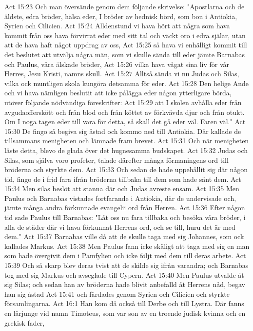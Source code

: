 Act 15:23  Och man översände genom dem följande skrivelse: "Apostlarna och de äldste, edra bröder, hälsa eder, I bröder av hednisk börd, som bon i Antiokia, Syrien och Cilicien.
Act 15:24  Alldenstund vi hava hört att några som hava kommit från oss hava förvirrat eder med sitt tal och väckt oro i edra själar, utan att de hava haft något uppdrag av oss,
Act 15:25  så hava vi enhälligt kommit till det beslutet att utvälja några män, som vi skulle sända till eder jämte Barnabas och Paulus, våra älskade bröder,
Act 15:26  vilka hava vågat sina liv för vår Herres, Jesu Kristi, namns skull.
Act 15:27  Alltså sända vi nu Judas och Silas, vilka ock muntligen skola kungöra detsamma för eder.
Act 15:28  Den helige Ande och vi hava nämligen beslutit att icke pålägga eder någon ytterligare börda, utöver följande nödvändiga föreskrifter:
Act 15:29  att I skolen avhålla eder från avgudaofferskött och från blod och från köttet av förkvävda djur och från otukt. Om I noga tagen eder till vara för detta, så skall det gå eder väl. Faren väl."
Act 15:30  De fingo så begiva sig åstad och kommo ned till Antiokia. Där kallade de tillsammans menigheten och lämnade fram brevet.
Act 15:31  Och när menigheten läste detta, blevo de glada över det hugnesamma budskapet.
Act 15:32  Judas och Silas, som själva voro profeter, talade därefter många förmaningens ord till bröderna och styrkte dem.
Act 15:33  Och sedan de hade uppehållit sig där någon tid, fingo de i frid fara ifrån bröderna tillbaka till dem som hade sänt dem.
Act 15:34  Men silas beslöt att stanna där och Judas avreste ensam.
Act 15:35  Men Paulus och Barnabas vistades fortfarande i Antiokia, där de undervisade och, jämte många andra förkunnade evangelii ord från Herren.
Act 15:36  Efter någon tid sade Paulus till Barnabas: "Låt oss nu fara tillbaka och besöka våra bröder, i alla de städer där vi hava förkunnat Herrens ord, och se till, huru det är med dem."
Act 15:37  Barnabas ville då att de skulle taga med sig Johannes, som ock kallades Markus.
Act 15:38  Men Paulus fann icke skäligt att taga med sig en man som hade övergivit dem i Pamfylien och icke följt med dem till deras arbete.
Act 15:39  Och så skarp blev deras tvist att de skilde sig ifrån varandra; och Barnabas tog med sig Markus och avseglade till Cypern.
Act 15:40  Men Paulus utvalde åt sig Silas; och sedan han av bröderna hade blivit anbefalld åt Herrens nåd, begav han sig åstad
Act 15:41  och färdades genom Syrien och Cilicien och styrkte församlingarna.
Act 16:1  Han kom då också till Derbe och till Lystra. Där fanns en lärjunge vid namn Timoteus, som var son av en troende judisk kvinna och en grekisk fader,
